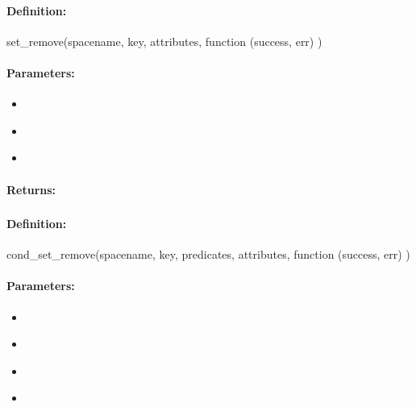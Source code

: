 \paragraph{Definition:}
\begin{javascriptcode}
set_remove(spacename, key, attributes, function (success, err) {})
\end{javascriptcode}
\paragraph{Parameters:}
\begin{itemize}[noitemsep]
\item {}\\

\item {}\\

\item {}\\

\end{itemize}

\paragraph{Returns:}


\pagebreak
\subsubsection{}
\label{api:nodejs:cond_set_remove}


\paragraph{Definition:}
\begin{javascriptcode}
cond_set_remove(spacename, key, predicates, attributes, function (success, err) {})
\end{javascriptcode}
\paragraph{Parameters:}
\begin{itemize}[noitemsep]
\item {}\\

\item {}\\

\item {}\\

\item {}\\

\end{itemize}

